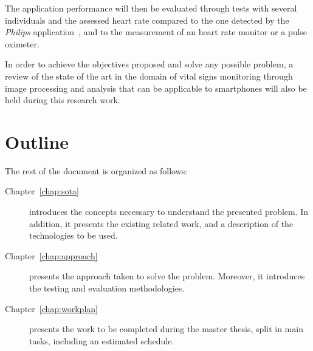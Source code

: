 The application performance will then be evaluated through tests
with several individuals and the assessed heart rate compared to
the one detected by the \emph{Philips} application~\cite{Philips2013}, 
and to the measurement of an heart rate monitor or a pulse 
oximeter.

In order to achieve the objectives proposed and solve any possible 
problem, a review of the state of the art in the domain of vital 
signs monitoring through image processing and analysis that can be 
applicable to smartphones will also be held during this research work.

\pagebreak

\section{Outline} \label{sec:outline}

The rest of the document is organized as follows:

\begin{description}
  \item[Chapter~\ref{chap:sota}] introduces the concepts necessary to 
        understand the presented problem. In addition, it presents
        the existing related work, and a description of the technologies 
        to be used.
  \item[Chapter~\ref{chap:approach}] presents the approach taken to 
        solve the problem. Moreover, it introduces the testing and 
        evaluation methodologies.
  \item[Chapter~\ref{chap:workplan}] presents the work to be completed 
        during the master thesis, split in main tasks, including an 
        estimated schedule.        
\end{description}
